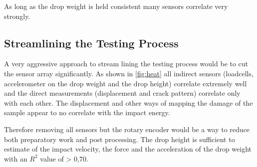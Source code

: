 


As long as the drop weight is held consistent many sensors correlate very strongly.



\subsection{Streamlining the Testing Process}

A very aggressive approach to stream lining the testing process would be to cut the sensor array significantly. As shown in \autoref{fig:heat} all indirect sensors (loadcells, accelerometer on the drop weight and the drop height) correlate extremely well and the direct measurements (displacement and crack pattern) correlate only with each other. The displacement and other ways of mapping the damage of the sample appear to no correlate with the impact energy.

Therefore removing all sensors but the rotary encoder would be a way to reduce both preparatory work and post processing. The drop height is sufficient to estimate of the impact velocity, the force and the acceleration of the drop weight with an \(R^2\) value of > 0,70.

